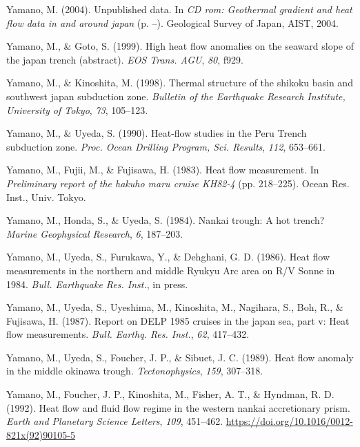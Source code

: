 \begin{CSLReferences}{1}{1}
\leavevmode{}%
Yamano, M. (2004). Unpublished data. In \emph{CD rom: Geothermal gradient and heat flow data in and around japan} (p. --). Geological Survey of Japan, AIST, 2004.

\leavevmode{}%
Yamano, M., \& Goto, S. (1999). High heat flow anomalies on the seaward slope of the japan trench (abstract). \emph{EOS Trans. AGU}, \emph{80}, f929.

\leavevmode{}%
Yamano, M., \& Kinoshita, M. (1998). Thermal structure of the shikoku basin and southwest japan subduction zone. \emph{Bulletin of the Earthquake Research Institute, University of Tokyo}, \emph{73}, 105--123.

\leavevmode{}%
Yamano, M., \& Uyeda, S. (1990). Heat-flow studies in the {Peru Trench} subduction zone. \emph{Proc. Ocean Drilling Program, Sci. Results}, \emph{112}, 653--661.

\leavevmode{}%
Yamano, M., Fujii, M., \& Fujisawa, H. (1983). Heat flow measurement. In \emph{Preliminary report of the hakuho maru cruise KH82-4} (pp. 218--225). Ocean Res. Inst., Univ. Tokyo.

\leavevmode{}%
Yamano, M., Honda, S., \& Uyeda, S. (1984). Nankai trough: A hot trench? \emph{Marine Geophysical Research}, \emph{6}, 187--203.

\leavevmode{}%
Yamano, M., Uyeda, S., Furukawa, Y., \& Dehghani, G. D. (1986). Heat flow measurements in the northern and middle {Ryukyu Arc} area on {R/V Sonne} in 1984. \emph{Bull. Earthquake Res. Inst.}, in press.

\leavevmode{}%
Yamano, M., Uyeda, S., Uyeshima, M., Kinoshita, M., Nagihara, S., Boh, R., \& Fujisawa, H. (1987). Report on DELP 1985 cruises in the japan sea, part v: Heat flow measurements. \emph{Bull. Earthq. Res. Inst.}, \emph{62}, 417--432.

\leavevmode{}%
Yamano, M., Uyeda, S., Foucher, J. P., \& Sibuet, J. C. (1989). Heat flow anomaly in the middle okinawa trough. \emph{Tectonophysics}, \emph{159}, 307--318.

\leavevmode{}%
Yamano, M., Foucher, J. P., Kinoshita, M., Fisher, A. T., \& Hyndman, R. D. (1992). Heat flow and fluid flow regime in the western nankai accretionary prism. \emph{Earth and Planetary Science Letters}, \emph{109}, 451--462. \url{https://doi.org/10.1016/0012-821x(92)90105-5}


\end{CSLReferences}
